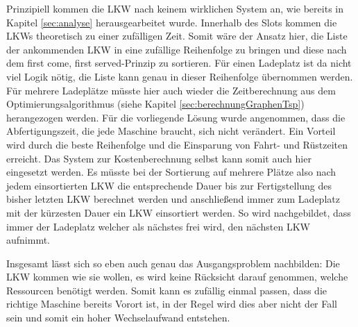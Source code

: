 Prinzipiell kommen die LKW nach keinem wirklichen System an, wie bereits in Kapitel \ref{sec:analyse} herausgearbeitet wurde. Innerhalb des Slots kommen die LKWs theoretisch zu einer zufälligen Zeit. Somit wäre der Ansatz hier, die Liste der ankommenden LKW in eine zufällige Reihenfolge zu bringen und diese nach dem \glqq{}first come, first served\grqq{}-Prinzip zu sortieren. Für einen Ladeplatz ist da nicht viel Logik nötig, die Liste kann genau in dieser Reihenfolge übernommen werden. Für mehrere Ladeplätze müsste hier auch wieder die Zeitberechnung aus dem Optimierungsalgorithmus (siehe Kapitel \ref{sec:berechnungGraphenTsp}) herangezogen werden. Für die vorliegende Lösung wurde angenommen, dass die Abfertigungszeit, die jede Maschine braucht, sich nicht verändert. Ein Vorteil wird durch die beste Reihenfolge und die Einsparung von Fahrt- und Rüstzeiten erreicht. Das System zur Kostenberechnung selbst kann somit auch hier eingesetzt werden. Es müsste bei der Sortierung auf mehrere Plätze also nach jedem einsortierten LKW die entsprechende Dauer bis zur Fertigstellung des bisher letzten LKW berechnet werden und anschließend immer zum Ladeplatz mit der kürzesten Dauer ein LKW einsortiert werden. So wird nachgebildet, dass immer der Ladeplatz welcher als nächstes frei wird, den nächsten LKW aufnimmt.

Insgesamt lässt sich so eben auch genau das Ausgangsproblem nachbilden: Die LKW kommen wie sie wollen, es wird keine Rücksicht darauf genommen, welche Ressourcen benötigt werden. Somit kann es zufällig einmal passen, dass die richtige Maschine bereits Vorort ist, in der Regel wird dies aber nicht der Fall sein und somit ein hoher Wechselaufwand entstehen.
